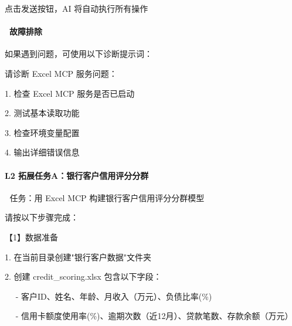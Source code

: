 \documentclass[
  american,
  chinese,
]{ctexart}
\begin{document}
{点击发送按钮，}\foreignlanguage{american}{AI }{将自动执行所有操作}\foreignlanguage{american}{}

\paragraph{\texorpdfstring{\foreignlanguage{american}{{~}}{故障排除}\foreignlanguage{american}{}}{~故障排除}}\label{ux6545ux969cux6392ux9664}

{如果遇到问题，可使用以下诊断提示词：}\foreignlanguage{american}{}

{请诊断}\foreignlanguage{american}{ Excel MCP }{服务问题：}\foreignlanguage{american}{}

\foreignlanguage{american}{1. }{检查}\foreignlanguage{american}{ Excel MCP }{服务是否已启动}\foreignlanguage{american}{}

\foreignlanguage{american}{2. }{测试基本读取功能}\foreignlanguage{american}{}

\foreignlanguage{american}{3. }{检查环境变量配置}\foreignlanguage{american}{}

\foreignlanguage{american}{4. }{输出详细错误信息}\foreignlanguage{american}{}

\paragraph{\texorpdfstring{\foreignlanguage{american}{L2 }{拓展任务A：银行客户信用评分分群}}{L2 拓展任务A：银行客户信用评分分群}}\label{l2-ext-a-credit}

\foreignlanguage{american}{\textbf{🏦 }}{任务：用}\foreignlanguage{american}{ Excel MCP }{构建银行客户信用评分分群模型}\foreignlanguage{american}{}

{请按以下步骤完成：}\foreignlanguage{american}{}

{【}\foreignlanguage{american}{1}{】数据准备}\foreignlanguage{american}{}

\foreignlanguage{american}{1. }{在当前目录创建}\foreignlanguage{american}{"}{银行客户数据}\foreignlanguage{american}{"}{文件夹}\foreignlanguage{american}{}

\foreignlanguage{american}{2. }{创建}\foreignlanguage{american}{ credit\_scoring.xlsx}{ }{包含以下字段：}\foreignlanguage{american}{}

\foreignlanguage{american}{{~~ }- }{客户}\foreignlanguage{american}{ID}{、姓名、年龄、月收入（万元）、负债比率}\foreignlanguage{american}{(\%)}

\foreignlanguage{american}{{~~ }- }{信用卡额度使用率}\foreignlanguage{american}{(\%)}{、逾期次数（近}\foreignlanguage{american}{12}{月）、贷款笔数、存款余额（万元）}\foreignlanguage{american}{}
\end{document}
